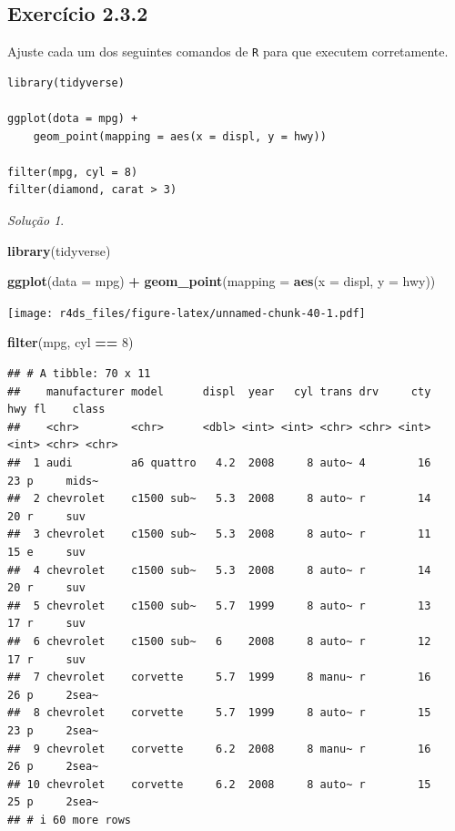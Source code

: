 \documentclass[
]{latex/krantz}
\newenvironment{Shaded}{\begin{snugshade}}{\end{snugshade}}
\newcommand{\AttributeTok}[1]{\textcolor[rgb]{0.13,0.29,0.53}{#1}}
\newcommand{\DecValTok}[1]{\textcolor[rgb]{0.00,0.00,0.81}{#1}}
\newcommand{\FunctionTok}[1]{\textcolor[rgb]{0.13,0.29,0.53}{\textbf{#1}}}
\newcommand{\NormalTok}[1]{#1}
\newcommand{\SpecialCharTok}[1]{\textcolor[rgb]{0.81,0.36,0.00}{\textbf{#1}}}
\theoremstyle{definition}
\theoremstyle{definition}
\theoremstyle{definition}
\theoremstyle{definition}
\theoremstyle{remark}
\newtheorem*{solution}{Solução}
\begin{document}
\hypertarget{exr2-3-2}{%
\subsection*{Exercício 2.3.2}\label{exr2-3-2}}

Ajuste cada um dos seguintes comandos de \texttt{R} para que executem corretamente.

\begin{verbatim}
library(tidyverse)

ggplot(dota = mpg) +
    geom_point(mapping = aes(x = displ, y = hwy))
    
filter(mpg, cyl = 8)
filter(diamond, carat > 3)
\end{verbatim}

\begin{solution}
\leavevmode

\begin{Shaded}
\begin{Highlighting}[]
\FunctionTok{library}\NormalTok{(tidyverse)}

\FunctionTok{ggplot}\NormalTok{(}\AttributeTok{data =}\NormalTok{ mpg) }\SpecialCharTok{+}
    \FunctionTok{geom\_point}\NormalTok{(}\AttributeTok{mapping =} \FunctionTok{aes}\NormalTok{(}\AttributeTok{x =}\NormalTok{ displ, }\AttributeTok{y =}\NormalTok{ hwy))}
\end{Highlighting}
\end{Shaded}

\texttt{[image: r4ds\_files/figure-latex/unnamed-chunk-40-1.pdf]}

\begin{Shaded}
\begin{Highlighting}[]
\FunctionTok{filter}\NormalTok{(mpg, cyl }\SpecialCharTok{==} \DecValTok{8}\NormalTok{)}
\end{Highlighting}
\end{Shaded}

\begin{verbatim}
## # A tibble: 70 x 11
##    manufacturer model      displ  year   cyl trans drv     cty   hwy fl    class
##    <chr>        <chr>      <dbl> <int> <int> <chr> <chr> <int> <int> <chr> <chr>
##  1 audi         a6 quattro   4.2  2008     8 auto~ 4        16    23 p     mids~
##  2 chevrolet    c1500 sub~   5.3  2008     8 auto~ r        14    20 r     suv  
##  3 chevrolet    c1500 sub~   5.3  2008     8 auto~ r        11    15 e     suv  
##  4 chevrolet    c1500 sub~   5.3  2008     8 auto~ r        14    20 r     suv  
##  5 chevrolet    c1500 sub~   5.7  1999     8 auto~ r        13    17 r     suv  
##  6 chevrolet    c1500 sub~   6    2008     8 auto~ r        12    17 r     suv  
##  7 chevrolet    corvette     5.7  1999     8 manu~ r        16    26 p     2sea~
##  8 chevrolet    corvette     5.7  1999     8 auto~ r        15    23 p     2sea~
##  9 chevrolet    corvette     6.2  2008     8 manu~ r        16    26 p     2sea~
## 10 chevrolet    corvette     6.2  2008     8 auto~ r        15    25 p     2sea~
## # i 60 more rows
\end{verbatim}


\end{solution}
\end{document}

